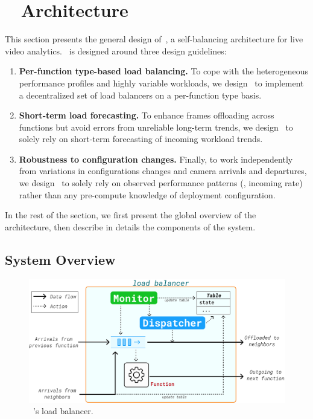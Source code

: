 \section{~\videojam{} Architecture}\label{sec:architecture}

This section presents the general design of~\videojam{}, a self-balancing architecture for live video analytics.~\videojam{} is designed around three design guidelines:
\begin{enumerate}[leftmargin=*]
    \item \textbf{Per-function type-based load balancing.} To cope with the heterogeneous performance profiles and highly variable workloads, we design~\videojam{} to implement a decentralized set of load balancers on a per-function type basis.
    \item \textbf{Short-term load forecasting.} To enhance frames offloading across functions but avoid errors from unreliable long-term trends, we design~\videojam{} to solely rely on short-term forecasting of incoming workload trends.
    \item \textbf{Robustness to configuration changes.} Finally, to work independently from variations in configurations changes and camera arrivals
    and departures, we design~\videojam{} to solely rely on observed performance patterns (\eg, incoming rate) rather than any pre-compute knowledge of
    deployment configuration.
\end{enumerate}

In the rest of the section, we first present the global overview of the~\videojam{} architecture, then describe in details the components of the system.

\subsection{System Overview}

\begin{figure}
    \centering
    \includegraphics[width=\linewidth]{chapters/videojam/images/videojam_architecture.pdf}
    \caption{~\videojam{}'s load balancer.}
    \label{fig:load_balancer}
\end{figure}

